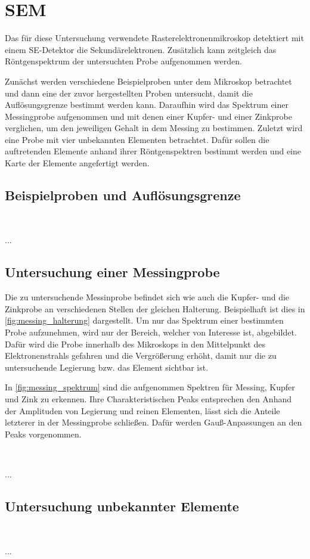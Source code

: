 \newpage
\section{SEM} %

	Das für diese Untersuchung verwendete Rasterelektronenmikroskop detektiert mit einem SE-Detektor die Sekundärelektronen.
	Zusätzlich kann zeitgleich das Röntgenspektrum der untersuchten Probe aufgenommen werden.
	
	Zunächst werden verschiedene Beispielproben unter dem Mikroskop betrachtet und dann eine der zuvor hergestellten Proben untersucht, damit die Auflösungsgrenze bestimmt werden kann.
	Daraufhin wird das Spektrum einer Messingprobe aufgenommen und mit denen einer Kupfer- und einer Zinkprobe verglichen, um den jeweiligen Gehalt in dem Messing zu bestimmen.
	Zuletzt wird eine Probe mit vier unbekannten Elementen betrachtet.
	Dafür sollen die auftretenden Elemente anhand ihrer Röntgenspektren bestimmt werden und eine Karte der Elemente angefertigt werden.

\subsection{Beispielproben und Auflösungsgrenze} %

	\
	
	...

\subsection{Untersuchung einer Messingprobe} %

	Die zu untersuchende Messinprobe befindet sich wie auch die Kupfer- und die Zinkprobe an verschiedenen Stellen der gleichen Halterung.
	Beispielhaft ist dies in \cref{fig:messing_halterung} dargestellt.
	Um nur das Spektrum einer bestimmten Probe aufzunehmen, wird nur der Bereich, welcher von Interesse ist, abgebildet.
	Dafür wird die Probe innerhalb des Mikroskops in den Mittelpunkt des Elektronenstrahls gefahren und die Vergrößerung erhöht, damit nur die zu untersuchende Legierung bzw. das Element sichtbar ist.
	
	In \cref{fig:messing_spektrum} sind die aufgenommen Spektren für Messing, Kupfer und Zink zu erkennen.
	Ihre Charakteristischen Peaks entsprechen den %
	Anhand der Amplituden von Legierung und reinen Elementen, lässt sich die Anteile letzterer in der Messingprobe schließen.
	Dafür werden Gauß-Anpassungen an den Peaks vorgenommen. %
	
	\
	
	...

\subsection{Untersuchung unbekannter Elemente} %

	\
	
	...
		
	
	
